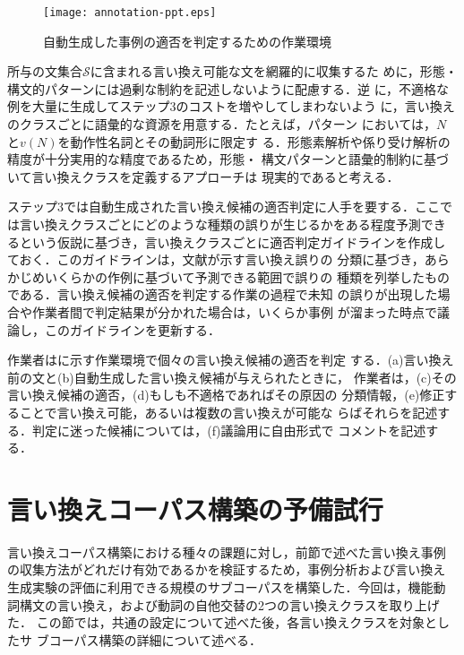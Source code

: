 \begin{figure*}[t]
\leavevmode
\begin{center}
\texttt{[image: annotation-ppt.eps]}
\caption{自動生成した事例の適否を判定するための作業環境}
\label{fig:annotation}
\end{center}
\end{figure*}

所与の文集合$\mathcal{S}$に含まれる言い換え可能な文を網羅的に収集するた
めに，形態・構文的パターンには過剰な制約を記述しないように配慮する．逆
に，不適格な例を大量に生成してステップ3のコストを増やしてしまわないよう
に，言い換えのクラスごとに語彙的な資源を用意する．たとえば，パターン
においては，$N$と$v(N)$を動作性名詞とその動詞形に限定す
る．形態素解析や係り受け解析の精度が十分実用的な精度であるため，形態・
構文パターンと語彙的制約に基づいて言い換えクラスを定義するアプローチは
現実的であると考える．

ステップ3では自動生成された言い換え候補の適否判定に人手を要する．ここで
は言い換えクラスごとにどのような種類の誤りが生じるかをある程度予測でき
るという仮説に基づき，言い換えクラスごとに適否判定ガイドラインを作成し
ておく．このガイドラインは，文献\cite{fujita:03:c}が示す言い換え誤りの
分類に基づき，あらかじめいくらかの作例に基づいて予測できる範囲で誤りの
種類を列挙したものである．言い換え候補の適否を判定する作業の過程で未知
の誤りが出現した場合や作業者間で判定結果が分かれた場合は，いくらか事例
が溜まった時点で議論し，このガイドラインを更新する．

作業者はに示す作業環境で個々の言い換え候補の適否を判定
する．(a)言い換え前の文と(b)自動生成した言い換え候補が与えられたときに，
作業者は，(c)その言い換え候補の適否，(d)もしも不適格であればその原因の
分類情報，(e)修正することで言い換え可能，あるいは複数の言い換えが可能な
らばそれらを記述する．判定に迷った候補については，(f)議論用に自由形式で
コメントを記述する．

\section{言い換えコーパス構築の予備試行}
\label{sec:trial}

言い換えコーパス構築における種々の課題に対し，前節で述べた言い換え事例
の収集方法がどれだけ有効であるかを検証するため，事例分析および言い換え
生成実験の評価に利用できる規模のサブコーパスを構築した．今回は，機能動
詞構文の言い換え，および動詞の自他交替の2つの言い換えクラスを取り上げた．
この節では，共通の設定について述べた後，各言い換えクラスを対象としたサ
ブコーパス構築の詳細について述べる．

